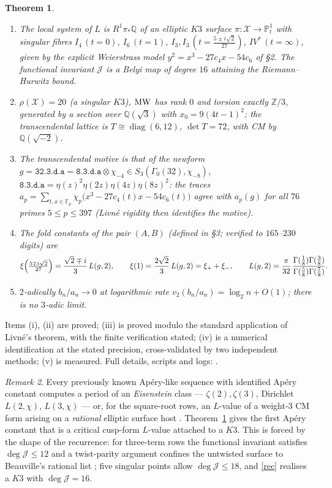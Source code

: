 \documentclass[11pt]{amsart}
\newtheorem{theorem}{Theorem}[section]
\theoremstyle{remark}
\newtheorem{remark}[theorem]{Remark}
\newcommand{\Z}{\mathbb Z}\newcommand{\Q}{\mathbb Q}\newcommand{\PP}{\mathbb P}\newcommand{\F}{\mathbb F}
\begin{document}
\begin{theorem}\label{main}
\begin{enumerate}
\item[(i)] The local system of $L$ is $R^1\pi_*\Q$ of an elliptic $K3$ surface $\pi:\mathcal X\to\PP^1_t$ with singular fibres $I_4\,(t=0)$, $I_6\,(t=1)$, $I_3,I_3\,(t=\tfrac{5\pm i\sqrt2}{27})$, $IV^*\,(t=\infty)$, given by the explicit Weierstrass model $y^2=x^3-27c_4x-54c_6$ of \S2. The functional invariant $\mathcal J$ is a Belyi map of degree $16$ attaining the Riemann--Hurwitz bound.
\item[(ii)] $\rho(\mathcal X)=20$ \textup{(}a singular $K3$\textup{)}, $\operatorname{MW}$ has rank $0$ and torsion exactly $\Z/3$, generated by a section over $\Q(\sqrt3)$ with $x_0=9(4t-1)^2$; the transcendental lattice is $T\cong\operatorname{diag}(6,12)$, $\det T=72$, with CM by $\Q(\sqrt{-2})$.
\item[(iii)] The transcendental motive is that of the newform $g=\texttt{32.3.d.a}=\texttt{8.3.d.a}\otimes\chi_{-4}\in S_3(\Gamma_0(32),\chi_{-8})$, $\texttt{8.3.d.a}=\eta(z)^2\eta(2z)\eta(4z)\eta(8z)^2$: the traces $a_p=\sum_{t,x\in\F_p}\chi_p\bigl(x^3-27c_4(t)x-54c_6(t)\bigr)$ agree with $a_p(g)$ for all $76$ primes $5\le p\le397$ \textup{(}Livn\'e rigidity then identifies the motive\textup{)}.
\item[(iv)] The fold constants of the pair $(A,B)$ \textup{(}defined in \S3; verified to $165$--$230$ digits\textup{)} are
\[\xi\Bigl(\tfrac{5\mp i\sqrt2}{27}\Bigr)=\frac{\sqrt2\mp i}{3}\,L(g,2),\qquad
\xi(1)=\frac{2\sqrt2}{3}\,L(g,2)=\xi_++\xi_-,\qquad
L(g,2)=\frac{\pi}{32}\,\frac{\Gamma(\tfrac18)\Gamma(\tfrac38)}{\Gamma(\tfrac58)\Gamma(\tfrac78)} .\]
\item[(v)] $2$-adically $b_n/a_n\to0$ at logarithmic rate $v_2(b_n/a_n)=\log_2n+O(1)$; there is no $3$-adic limit.
\end{enumerate}
\end{theorem}
Items (i), (ii) are proved; (iii) is proved modulo the standard application of Livn\'e's theorem, with the finite verification stated; (iv) is a numerical identification at the stated precision, cross-validated by two independent methods; (v) is measured. Full details, scripts and logs: \cite{K3P,FTS}.

\begin{remark}
Every previously known Ap\'ery-like sequence with identified Ap\'ery constant computes a period of an \emph{Eisenstein} class --- $\zeta(2),\zeta(3)$, Dirichlet $L(2,\chi)$, $L(3,\chi)$ --- or, for the square-root rows, an $L$-value of a weight-$3$ CM form arising on a \emph{rational} elliptic surface host \cite{Beu87,Zag}. Theorem~\ref{main} gives the first Ap\'ery constant that is a critical cusp-form $L$-value attached to a $K3$. This is forced by the shape of the recurrence: for three-term rows the functional invariant satisfies $\deg\mathcal J\le12$ and a twist-parity argument confines the untwisted surface to Beauville's rational list \cite{CLASS}; five singular points allow $\deg\mathcal J\le18$, and \eqref{rec} realises a $K3$ with $\deg\mathcal J=16$.
\end{remark}
\end{document}
